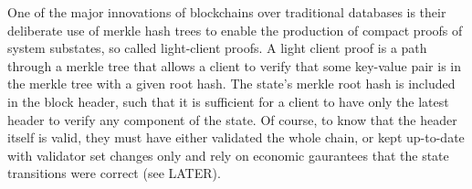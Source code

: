 One of the major innovations of blockchains over traditional databases is their deliberate use of merkle hash trees to enable the production
of compact proofs of system substates, so called light-client proofs.
A light client proof is a path through a merkle tree that allows a client to verify that some key-value pair is in the merkle tree with a given root hash.
The state's merkle root hash is included in the block header, such that it is sufficient for a client to have only the latest header to verify any component of the state.
Of course, to know that the header itself is valid, they must have either validated the whole chain, 
or kept up-to-date with validator set changes only and rely on economic gaurantees that the state transitions were correct (see LATER).
